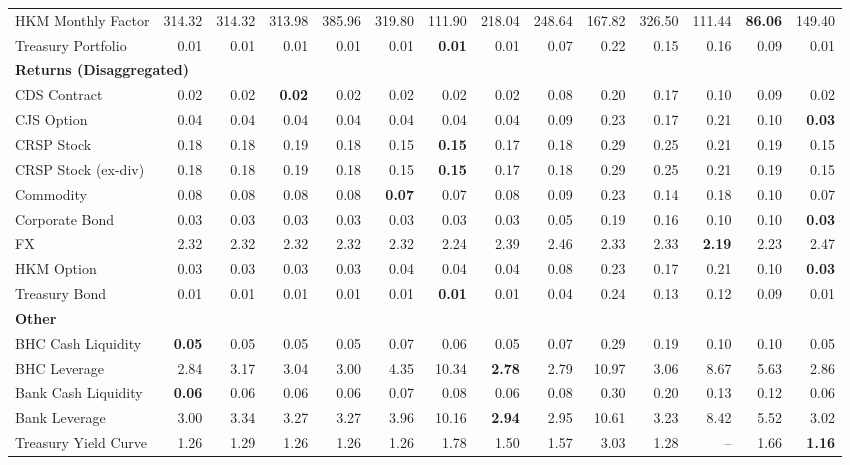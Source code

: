 \begin{table}[htbp]
\begin{tabular}{@{}lrrrrrrrrrrrrr@{}}
HKM Monthly Factor & 314.32 & 314.32 & 313.98 & 385.96 & 319.80 & 111.90 & 218.04 & 248.64 & 167.82 & 326.50 & 111.44 & \textbf{86.06} & 149.40 \\
Treasury Portfolio & 0.01 & 0.01 & 0.01 & 0.01 & 0.01 & \textbf{0.01} & 0.01 & 0.07 & 0.22 & 0.15 & 0.16 & 0.09 & 0.01 \\
\midrule
\multicolumn{14}{l}{\textbf{Returns (Disaggregated)}} \\
CDS Contract & 0.02 & 0.02 & \textbf{0.02} & 0.02 & 0.02 & 0.02 & 0.02 & 0.08 & 0.20 & 0.17 & 0.10 & 0.09 & 0.02 \\
CJS Option & 0.04 & 0.04 & 0.04 & 0.04 & 0.04 & 0.04 & 0.04 & 0.09 & 0.23 & 0.17 & 0.21 & 0.10 & \textbf{0.03} \\
CRSP Stock & 0.18 & 0.18 & 0.19 & 0.18 & 0.15 & \textbf{0.15} & 0.17 & 0.18 & 0.29 & 0.25 & 0.21 & 0.19 & 0.15 \\
CRSP Stock (ex-div) & 0.18 & 0.18 & 0.19 & 0.18 & 0.15 & \textbf{0.15} & 0.17 & 0.18 & 0.29 & 0.25 & 0.21 & 0.19 & 0.15 \\
Commodity & 0.08 & 0.08 & 0.08 & 0.08 & \textbf{0.07} & 0.07 & 0.08 & 0.09 & 0.23 & 0.14 & 0.18 & 0.10 & 0.07 \\
Corporate Bond & 0.03 & 0.03 & 0.03 & 0.03 & 0.03 & 0.03 & 0.03 & 0.05 & 0.19 & 0.16 & 0.10 & 0.10 & \textbf{0.03} \\
FX & 2.32 & 2.32 & 2.32 & 2.32 & 2.32 & 2.24 & 2.39 & 2.46 & 2.33 & 2.33 & \textbf{2.19} & 2.23 & 2.47 \\
HKM Option & 0.03 & 0.03 & 0.03 & 0.03 & 0.04 & 0.04 & 0.04 & 0.08 & 0.23 & 0.17 & 0.21 & 0.10 & \textbf{0.03} \\
Treasury Bond & 0.01 & 0.01 & 0.01 & 0.01 & 0.01 & \textbf{0.01} & 0.01 & 0.04 & 0.24 & 0.13 & 0.12 & 0.09 & 0.01 \\
\midrule
\multicolumn{14}{l}{\textbf{Other}} \\
BHC Cash Liquidity & \textbf{0.05} & 0.05 & 0.05 & 0.05 & 0.07 & 0.06 & 0.05 & 0.07 & 0.29 & 0.19 & 0.10 & 0.10 & 0.05 \\
BHC Leverage & 2.84 & 3.17 & 3.04 & 3.00 & 4.35 & 10.34 & \textbf{2.78} & 2.79 & 10.97 & 3.06 & 8.67 & 5.63 & 2.86 \\
Bank Cash Liquidity & \textbf{0.06} & 0.06 & 0.06 & 0.06 & 0.07 & 0.08 & 0.06 & 0.08 & 0.30 & 0.20 & 0.13 & 0.12 & 0.06 \\
Bank Leverage & 3.00 & 3.34 & 3.27 & 3.27 & 3.96 & 10.16 & \textbf{2.94} & 2.95 & 10.61 & 3.23 & 8.42 & 5.52 & 3.02 \\
Treasury Yield Curve & 1.26 & 1.29 & 1.26 & 1.26 & 1.26 & 1.78 & 1.50 & 1.57 & 3.03 & 1.28 & -- & 1.66 & \textbf{1.16} \\
\bottomrule
\end{tabular}
\vspace{0.1cm}

\end{table}
